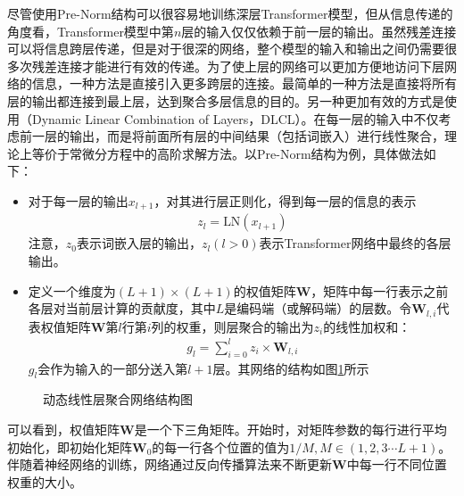 \parinterval 尽管使用Pre-Norm结构可以很容易地训练深层Transformer模型，但从信息传递的角度看，Transformer模型中第$n$层的输入仅仅依赖于前一层的输出。虽然残差连接可以将信息跨层传递，但是对于很深的网络，整个模型的输入和输出之间仍需要很多次残差连接才能进行有效的传递。为了使上层的网络可以更加方便地访问下层网络的信息，一种方法是直接引入更多跨层的连接。最简单的一种方法是直接将所有层的输出都连接到最上层，达到聚合多层信息的目的\cite{DBLP:conf/emnlp/BapnaCFCW18,wang-etal-2018-multi-layer}。另一种更加有效的方式是使用{\small{}}（Dynamic Linear Combination of Layers，DLCL）。在每一层的输入中不仅考虑前一层的输出，而是将前面所有层的中间结果（包括词嵌入）进行线性聚合，理论上等价于常微分方程中的高阶求解方法\cite{WangLearning}。以Pre-Norm结构为例，具体做法如下：
\begin{itemize}
\vspace{0.5em}
\item 对于每一层的输出$x_{l+1}$，对其进行层正则化，得到每一层的信息的表示
\begin{eqnarray}
z_{l}=\textrm{LN}(x_{l+1})
\label{eq:7-20}
\end{eqnarray}
注意，$z_0$表示词嵌入层的输出，$z_l(l>0)$表示Transformer网络中最终的各层输出。
\vspace{0.5em}
\item 	定义一个维度为$(L+1)\times(L+1)$的权值矩阵$\mathbf{W}$，矩阵中每一行表示之前各层对当前层计算的贡献度，其中$L$是编码端（或解码端）的层数。令$\mathbf{W}_{l,i}$代表权值矩阵$\mathbf{W}$第$l$行第$i$列的权重，则层聚合的输出为$z_i$的线性加权和：
\begin{eqnarray}
g_l=\sum_{i=0}^{l}z_i\times \mathbf{W}_{l,i}
\label{eq:7-21}
\end{eqnarray}
$g_l$会作为输入的一部分送入第$l+1$层。其网络的结构如图\ref{fig:7-29}所示
\end{itemize}

\begin{figure}[htp]
\centering

\caption{动态线性层聚合网络结构图}
\label{fig:7-29}
\end{figure}

\parinterval 可以看到，权值矩阵$\mathbf{W}$是一个下三角矩阵。开始时，对矩阵参数的每行进行平均初始化，即初始化矩阵$\mathbf{W}_0$的每一行各个位置的值为$1/M,M \in (1,2,3 \cdots L+1)$。 伴随着神经网络的训练，网络通过反向传播算法来不断更新$\mathbf{W}$中每一行不同位置权重的大小。

